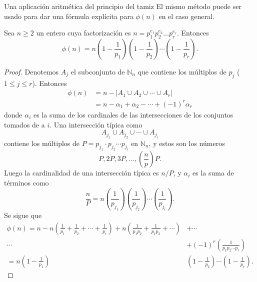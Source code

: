 \begin{section}{Una aplicación aritmética del principio del tamiz}
El mismo método puede ser usado para dar una fórmula explícita para $\phi(n)$ en el caso general.

\begin{teorema}\label{tA2.2} Sea $n \ge 2$ un entero cuya factorización es $n=p_1^{e_1}p_2^{e_2}\ldots p_r^{e_r}$. Entonces $$
\phi(n)=n\left(1-\frac{1}{p_1}\right)\left(1-\frac{1}{p_2}\right)\cdots\left(1-\frac{1}{p_r}\right).
$$
\end{teorema}
\begin{proof} Denotemos $A_j$ el subconjunto de $\mathbb N_n$ que contiene los múltiplos de $p_j$ ($1\le j \le r$). Entonces 
$$
\begin{aligned}
\phi(n) &= n- |A_1 \cup A_2 \cup \cdots \cup A_r| \\
       &= n -\alpha_1+ \alpha_2- \cdots +(-1)^r\alpha_r
\end{aligned}
$$
donde $\alpha_i$ es la suma de los cardinales de las intersecciones de los conjuntos tomados de a $i$. Una intersección típica como
$$
A_{j_1}\cup A_{j_2}\cup \cdots \cup A_{j_i}
$$
contiene los múltiplos de $P= p_{j_1}\cdot p_{j_2}\cdots p_{j_i}$ en $\mathbb N_n$, y estos son los números
$$
P,2P,3P,\ldots,\left(\frac{n}{p}\right)P.
$$
Luego la cardinalidad de una intersección típica es $n/P$, y $\alpha_i$ es la suma de términos como
$$
\frac{n}{P}=
n\left(\frac{1}{p_{j_1}}\right)\left(\frac{1}{p_{j_2}}\right)\cdots
\left(\frac{1}{p_{j_i}}\right).
$$
Se sigue que
$$
\begin{aligned} \phi(n) = n - n\left(\frac{1}{p_1} + \frac{1}{p_2} +
\cdots +\frac{1}{p_r}\right) +n\left(\frac{1}{p_1p_2}
+ \frac{1}{p_1p_3}+\cdots\right) &+ \cdots \\
\cdots &+ (-1)^r \left(\frac{1}{p_1p_2 \cdots p_r}\right) \\
=n\left(1-\frac{1}{p_1}\right)&\left(1-\frac{1}{p_2}\right)\cdots\left(1-\frac{1}{p_r}\right).
\end{aligned}
$$
\end{proof}


\end{section}